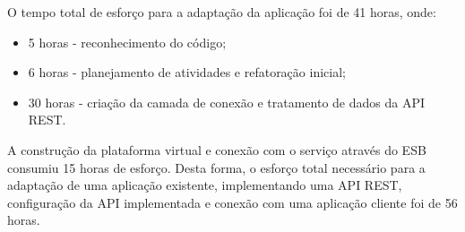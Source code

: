 O tempo total de esforço para a adaptação da aplicação foi de 41 horas, onde:
\begin{itemize}
\item 5 horas - reconhecimento do código;
\item 6 horas - planejamento de atividades e refatoração inicial;
\item 30 horas - criação da camada de conexão e tratamento de dados da API REST.
\end{itemize}

A construção da plataforma virtual e conexão com o serviço através do ESB consumiu 15 horas de esforço. Desta forma, o esforço total necessário para a adaptação de uma aplicação existente, implementando uma API REST, configuração da API implementada e conexão com uma aplicação cliente foi de 56 horas.
